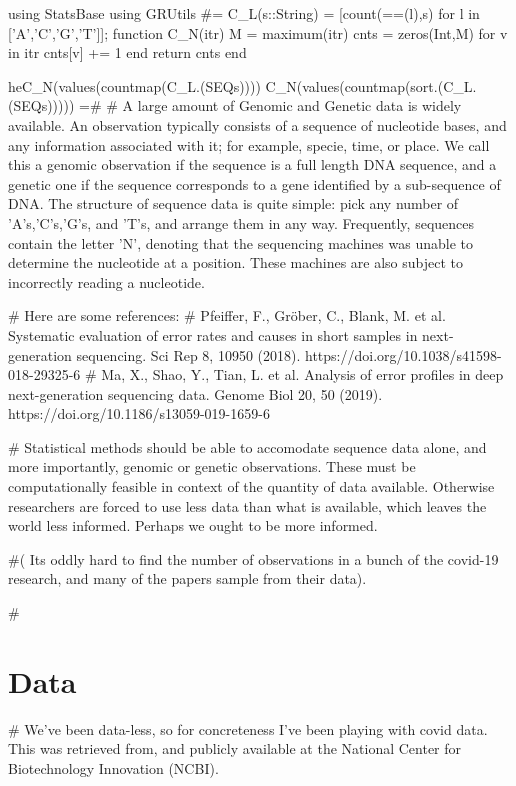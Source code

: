 using StatsBase
using GRUtils
#=
C_L(s::String) = [count(==(l),s) for l in ['A','C','G','T']];
function C_N(itr)
    M = maximum(itr)
    cnts = zeros(Int,M)
   	for v in itr cnts[v] += 1 end
    return cnts
end

heC_N(values(countmap(C_L.(SEQs))))
C_N(values(countmap(sort.(C_L.(SEQs)))))
=#
# A large amount of Genomic and Genetic data is widely available. An observation typically consists of a sequence of nucleotide bases, and any information associated with it; for example, specie, time, or place. We call this a genomic observation if the sequence is a full length DNA sequence, and a genetic one if the sequence corresponds to a gene identified by a sub-sequence of DNA. The structure of sequence data is quite simple: pick any number of 'A's,'C's,'G's, and 'T's, and arrange them in any way. Frequently, sequences contain the letter 'N', denoting that the sequencing machines was unable to determine the nucleotide at a position. These machines are also subject to incorrectly reading a nucleotide.

# Here are some references:
# Pfeiffer, F., Gröber, C., Blank, M. et al. Systematic evaluation of error rates and causes in short samples in next-generation sequencing. Sci Rep 8, 10950 (2018). https://doi.org/10.1038/s41598-018-29325-6
# Ma, X., Shao, Y., Tian, L. et al. Analysis of error profiles in deep next-generation sequencing data. Genome Biol 20, 50 (2019). https://doi.org/10.1186/s13059-019-1659-6

# Statistical methods should be able to accomodate sequence data alone, and more importantly, genomic or genetic observations. These must be computationally feasible in context of the quantity of data available. Otherwise researchers are forced to use less data than what is available, which leaves the world less informed. Perhaps we ought to be more informed.

#( Its oddly hard to find the number of observations in a bunch of the covid-19 research, and many of the papers sample from their data).

# \section{Data}
# We've been data-less, so for concreteness I've been playing with covid data.  This was retrieved from, and publicly available at the National Center for Biotechnology Innovation (NCBI).

